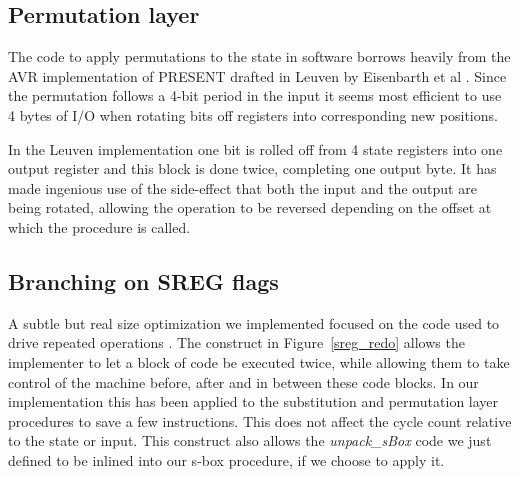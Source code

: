 \documentclass{llncs}
\begin{document}


\subsection{Permutation layer}
The code to apply permutations to the state in software borrows heavily from the AVR implementation of PRESENT drafted in Leuven by Eisenbarth et al \cite{eisenbarth2012compact}.
Since the permutation follows a 4-bit period in the input it seems most efficient to use 4 bytes of I/O when rotating bits off registers into corresponding new positions.

In the Leuven implementation one bit is rolled off from 4 state registers into one output register and this block is done twice, completing one output byte. It has made ingenious use of the side-effect that both the input and the output are being rotated, allowing the operation to be reversed depending on the offset at which the procedure is called.

\subsection{Branching on SREG flags}
A subtle but real size optimization we implemented focused on the code used to drive repeated operations .
The construct in Figure~\ref{sreg_redo} allows the implementer to let a block of code be executed twice, while allowing them to take control of the machine before, after and in between these code blocks.
In our implementation this has been applied to the substitution and permutation layer procedures to save a few instructions.
This does not affect the cycle count relative to the state or input.
This construct also allows the \textit{unpack\_sBox} code we just defined to be inlined into our s-box procedure, if we choose to apply it.
\end{document}
